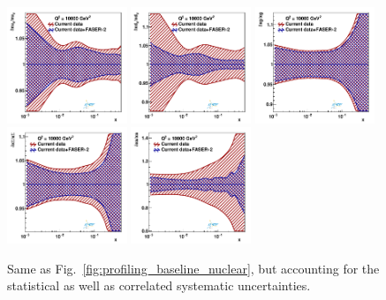 \begin{figure}[t]
\centering
\includegraphics[width=0.32\textwidth]{plots/nuclear_fasernu2/inclusive+charm_chargediscrimination/syst_FASERv2_q2_10000_pdf_uv_ratio.pdf}
\includegraphics[width=0.32\textwidth]{plots/nuclear_fasernu2/inclusive+charm_chargediscrimination/syst_FASERv2_q2_10000_pdf_dv_ratio.pdf}
\includegraphics[width=0.32\textwidth]{plots/nuclear_fasernu2/inclusive+charm_chargediscrimination/syst_FASERv2_q2_10000_pdf_g_ratio.pdf}\\
\includegraphics[width=0.32\textwidth]{plots/nuclear_fasernu2/inclusive+charm_chargediscrimination/syst_FASERv2_q2_10000_pdf_Sea_ratio.pdf}
\includegraphics[width=0.32\textwidth]{plots/nuclear_fasernu2/inclusive+charm_chargediscrimination/syst_FASERv2_q2_10000_pdf_s_ratio.pdf}
\caption{Same as Fig.~\ref{fig:profiling_baseline_nuclear}, 
but accounting for the statistical as well as correlated systematic uncertainties.
}
\label{fig:profiling_syst_nuclear}
\end{figure}
